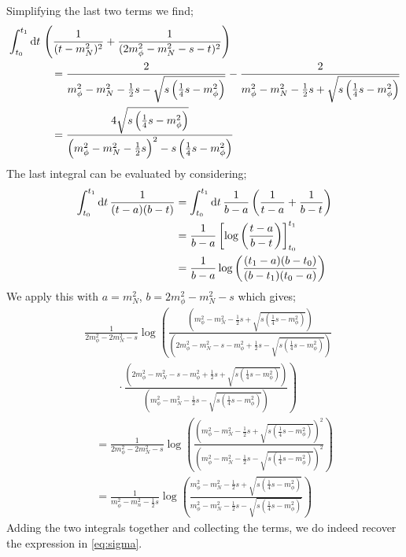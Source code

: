 \documentclass[10pt]{article}
\begin{document}
Simplifying the last two terms we find;
\begin{align*}
&\int_{t_0}^{t_1}{\text{d}t \,\left(\frac{1}{(t - m_N^2)^2} + \frac{1}{(2m_\phi^2 - m_N^2 - s - t)^2}\right)} \\
&\qquad \qquad= \frac{2}{m_\phi^2 - m_N^2 - \frac{1}{2}s - \sqrt{s\left(\frac{1}{4}s - m_\phi^2\right)}} - \frac{2}{m_\phi^2 - m_N^2 - \frac{1}{2}s + \sqrt{s\left(\frac{1}{4}s - m_\phi^2\right)}} \\
&\qquad \qquad= \frac{4\sqrt{s\left(\frac{1}{4}s - m_\phi^2\right)}}{\left(m_\phi^2 - m_N^2 - \frac{1}{2}s\right)^2 - s\left(\frac{1}{4}s - m_\phi^2\right)}
\end{align*}
The last integral can be evaluated by considering;
\begin{align*}
\int_{t_0}^{t_1}{\text{d}t \,\frac{1}{(t - a)(b - t)}} &= \int_{t_0}^{t_1}{\text{d}t \,\frac{1}{b - a}\left(\frac{1}{t - a} + \frac{1}{b - t}\right)} \\
&= \frac{1}{b - a}\left[\log\left(\frac{t - a}{b - t}\right)\right]_{t_0}^{t_1} \\
&= \frac{1}{b - a}\log\left(\frac{(t_1 - a)(b - t_0)}{(b - t_1)(t_0 - a)}\right)
\end{align*}
We apply this with $a = m_N^2$, $b = 2m_\phi^2 - m_N^2 - s$ which gives;
\begin{align*}
&\frac{1}{2m_\phi^2 - 2m_N^2 - s}\log\left( \frac{\left(m_\phi^2 - m_N^2 -\frac{1}{2}s + \sqrt{s\left(\frac{1}{4}s - m_\phi^2\right)}\right)}{\left(2m_\phi^2 - m_N^2 - s - m_\phi^2 + \frac{1}{2}s - \sqrt{s\left(\frac{1}{4}s - m_\phi^2\right)}\right)} \right. \\
& \qquad \quad \cdot \left. \frac{\left(2m_\phi^2 - m_N^2 - s - m_\phi^2 + \frac{1}{2}s +  \sqrt{s\left(\frac{1}{4}s - m_\phi^2\right)}\right)}{\left(m_\phi^2 - m_N^2 -\frac{1}{2}s - \sqrt{s\left(\frac{1}{4}s - m_\phi^2\right)}\right)}\right) \\
&\quad=\frac{1}{2m_\phi^2 - 2m_N^2 - s} \log\left(\frac{\left(m_\phi^2 - m_N^2 -\frac{1}{2}s + \sqrt{s\left(\frac{1}{4}s - m_\phi^2\right)}\right)^2}{\left(m_\phi^2 - m_N^2 -\frac{1}{2}s - \sqrt{s\left(\frac{1}{4}s - m_\phi^2\right)}\right)^2}\right) \\
&\quad=\frac{1}{m_\phi^2 - m_n^2 - \frac{1}{2}s}\log\left(\frac{m_\phi^2 - m_N^2 - \frac{1}{2}s + \sqrt{s\left(\frac{1}{4}s - m_\phi^2\right)}}{m_\phi^2 - m_N^2 - \frac{1}{2}s - \sqrt{s\left(\frac{1}{4}s - m_\phi^2\right)}}\right)
\end{align*}
Adding the two integrals together and collecting the terms, we do indeed recover the expression in \eqref{eq:sigma}.
\end{document}
